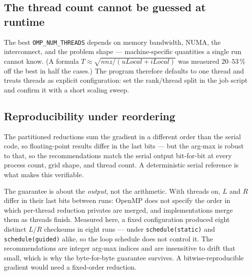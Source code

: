 \documentclass[twocolumn]{article}
\begin{document}
    \subsection{The thread count cannot be guessed at runtime}\label{subsec:threads}
    The best \texttt{OMP\_NUM\_THREADS} depends on memory bandwidth, NUMA, the
    interconnect, and the problem shape --- machine-specific quantities a single run cannot
    know. (A formula $T \approx \sqrt{\textit{nnz}/(\textit{uLocal}+\textit{iLocal})}$ was
    measured $20$--$53\,\%$ off the best in half the cases.) The program therefore defaults
    to one thread and treats threads as explicit configuration: set the rank/thread split
    in the job script and confirm it with a short scaling sweep.

    \subsection{Reproducibility under reordering}\label{subsec:repro}
    The partitioned reductions sum the gradient in a different order than the serial code,
    so floating-point results differ in the last bits --- but the arg-max is robust to
    that, so the recommendations match the serial output bit-for-bit at every process
    count, grid shape, and thread count. A deterministic serial reference is what makes
    this verifiable.

    The guarantee is about the \emph{output}, not the arithmetic. With threads on, $L$ and
    $R$ differ in their last bits between runs: OpenMP does not specify the order in which
    per-thread reduction privates are merged, and implementations merge them as threads
    finish. Measured here, a fixed configuration produced eight distinct $L$/$R$ checksums
    in eight runs --- under \texttt{schedule(static)} and \texttt{schedule(guided)} alike,
    so the loop schedule does not control it. The recommendations are integer arg-max
    indices and are insensitive to drift that small, which is why the byte-for-byte
    guarantee survives. A bitwise-reproducible gradient would need a fixed-order
    reduction.
\end{document}
